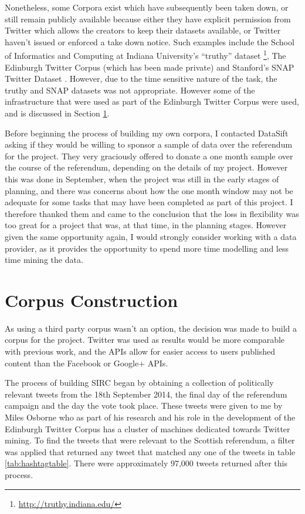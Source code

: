 \documentclass[bsc,frontabs,singlespacing,parskip]{infthesis}     %
\begin{document}
Nonetheless, some Corpora exist which have subsequently been taken down, or still remain publicly available because either they have explicit permission from Twitter which allows the creators to keep their datasets available, or Twitter haven't issued or enforced a take down notice. Such examples include the School of Informatics and Computing at Indiana University's ``truthy'' dataset \footnote{\url{http://truthy.indiana.edu/}}, The Edinburgh Twitter Corpus \cite{petrovic2010edinburgh} (which has been made private) and Stanford's SNAP Twitter Dataset \cite{snapnets}. However, due to the time sensitive nature of the task, the truthy and SNAP datasets was not appropriate. However some of the infrastructure that were used as part of the Edinburgh Twitter Corpus were used, and is discussed in Section \ref{sec:construction}. 

Before beginning the process of building my own corpora, I contacted DataSift asking if they would be willing to sponsor a sample of data over the referendum for the project. They very graciously offered to donate a one month sample over the course of the referendum, depending on the details of my project. However this was done in September, when the project was still in the early stages of planning, and there was concerns about how the one month window may not be adequate for some tasks that may have been completed as part of this project. I therefore thanked them and came to the conclusion that the loss in flexibility was too great for a project that was, at that time, in the planning stages. However given the same opportunity again, I would strongly consider working with a data provider, as it provides the opportunity to spend more time modelling and less time mining the data.

\section{Corpus Construction}
\label{sec:construction}

As using a third party corpus wasn't an option, the decision was made to build a corpus for the project. Twitter was used as results would be more comparable with previous work, and the APIs allow for easier access to users published content than the Facebook or Google+ APIs.

The process of building SIRC began by obtaining a collection of politically relevant tweets from the 18th September 2014, the final day of the referendum campaign and the day the vote took place. These tweets were given to me by Miles Osborne who as part of his research and his role in the development of the Edinburgh Twitter Corpus has a cluster of machines dedicated towards Twitter mining. To find the tweets that were relevant to the Scottish referendum, a filter was applied that returned any tweet that matched any one of the tweets in table \ref{tab:hashtagtable}. There were approximately 97,000 tweets returned after this process. 
\end{document}
